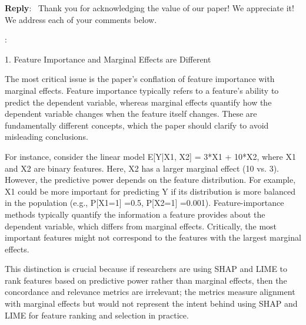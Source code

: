 \documentclass[11pt]{article}
\newcounter{se}[section]
\newcounter{reviewer}
\newcounter{point}[reviewer]
\renewcommand{\thepoint}{R\,\thereviewer.\arabic{point}}
\newenvironment{point}{
    \refstepcounter{point} \bigskip \noindent {\textbf{\thepoint}}: \rmfamily \itshape
}{\medskip}
\newenvironment{reply}
 {\par\medskip \noindent \begin{sf}\textbf{Reply}:\ }
 {\medskip \end{sf}}
\begin{document}
\begin{reply}
Thank you for acknowledging the value of our paper! We appreciate it! We address each of your comments below.
\end{reply}


\begin{point}
1.      Feature Importance and Marginal Effects are Different 

The most critical issue is the paper’s conflation of feature importance with marginal effects. Feature importance typically refers to a feature's ability to predict the dependent variable, whereas marginal effects quantify how the dependent variable changes when the feature itself changes. These are fundamentally different concepts, which the paper should clarify to avoid misleading conclusions.

For instance, consider the linear model E[Y|X1, X2] = 3*X1 + 10*X2, where X1 and X2 are binary features. Here, X2 has a larger marginal effect (10 vs. 3). However, the predictive power depends on the feature distribution. For example, X1 could be more important for predicting Y if its distribution is more balanced in the population (e.g., P[X1=1] =0.5, P[X2=1] =0.001).
Feature-importance methods typically quantify the information a feature provides about the dependent variable, which differs from marginal effects. Critically, the most important features might not correspond to the features with the largest marginal effects.

This distinction is crucial because if researchers are using SHAP and LIME to rank features based on predictive power rather than marginal effects, then the concordance and relevance metrics are irrelevant; the metrics measure alignment with marginal effects but would not represent the intent behind using SHAP and LIME for feature ranking and selection in practice.

\end{point}
\end{document}
